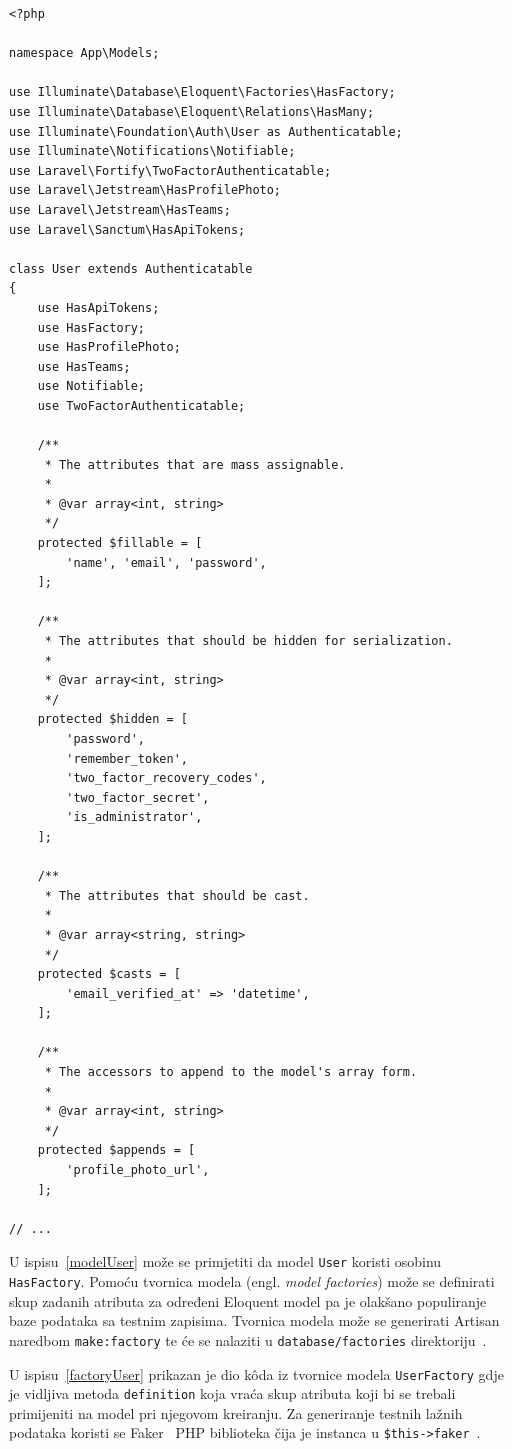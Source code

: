 \begin{lstlisting}[caption={Dio k\^oda model klase \texttt{User}}, label=modelUser]
<?php

namespace App\Models;

use Illuminate\Database\Eloquent\Factories\HasFactory;
use Illuminate\Database\Eloquent\Relations\HasMany;
use Illuminate\Foundation\Auth\User as Authenticatable;
use Illuminate\Notifications\Notifiable;
use Laravel\Fortify\TwoFactorAuthenticatable;
use Laravel\Jetstream\HasProfilePhoto;
use Laravel\Jetstream\HasTeams;
use Laravel\Sanctum\HasApiTokens;

class User extends Authenticatable
{
    use HasApiTokens;
    use HasFactory;
    use HasProfilePhoto;
    use HasTeams;
    use Notifiable;
    use TwoFactorAuthenticatable;

    /**
     * The attributes that are mass assignable.
     *
     * @var array<int, string>
     */
    protected $fillable = [
        'name', 'email', 'password',
    ];

    /**
     * The attributes that should be hidden for serialization.
     *
     * @var array<int, string>
     */
    protected $hidden = [
        'password',
        'remember_token',
        'two_factor_recovery_codes',
        'two_factor_secret',
        'is_administrator',
    ];

    /**
     * The attributes that should be cast.
     *
     * @var array<string, string>
     */
    protected $casts = [
        'email_verified_at' => 'datetime',
    ];

    /**
     * The accessors to append to the model's array form.
     *
     * @var array<int, string>
     */
    protected $appends = [
        'profile_photo_url',
    ];
    
// ...
\end{lstlisting}

U ispisu~\ref{modelUser} može se primjetiti da model \texttt{User} koristi osobinu \texttt{HasFactory}. Pomoću tvornica modela (engl. \textit{model factories}) može se definirati skup zadanih atributa za određeni Eloquent model pa je olakšano populiranje baze podataka sa testnim zapisima. Tvornica modela može se generirati Artisan naredbom \texttt{make:factory} te će se nalaziti u \texttt{database/factories} direktoriju~\cite{factories}.

U ispisu~\ref{factoryUser} prikazan je dio k\^oda iz tvornice modela \texttt{UserFactory} gdje je vidljiva metoda \texttt{definition} koja vraća skup atributa koji bi se trebali primijeniti na model pri njegovom kreiranju. Za generiranje testnih lažnih podataka koristi se Faker~\cite{fakerGitHub} PHP biblioteka čija je instanca u \texttt{\$this->faker}~\cite{factories}.

